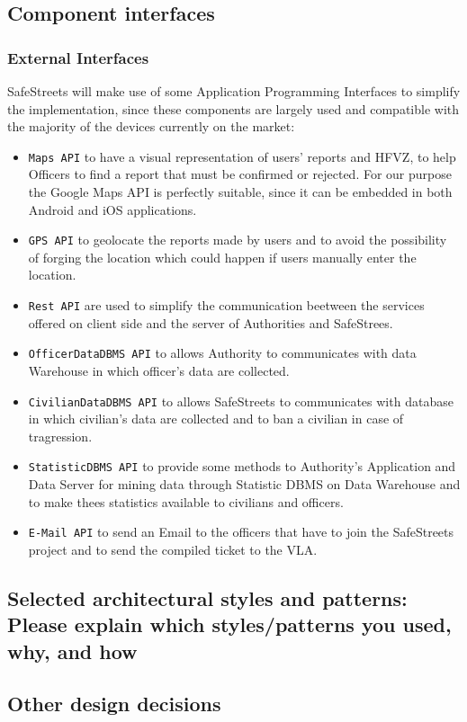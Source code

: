 \documentclass[12pt,a4paper]{article}
\begin{document}
\subsection{Component interfaces}
\subsubsection{External Interfaces}
SafeStreets will make use of some Application Programming Interfaces to simplify the implementation, since these components are largely used and compatible with the majority of the devices currently on the market:
\begin{itemize}
\item \texttt{Maps API} to have a visual representation of users' reports and HFVZ, to help Officers to find a report that must be confirmed or rejected. For our purpose the Google Maps API is perfectly suitable, since it can be embedded in both Android and iOS applications.
\item \texttt{GPS API} to geolocate the reports made by users and to avoid the possibility of forging the location which could happen if users manually enter the location.
\item \texttt{Rest API} are used to simplify the communication beetween the services offered on client side and the server of Authorities and SafeStrees.
\item \texttt{OfficerDataDBMS API} to allows Authority to communicates with data Warehouse in which officer's data are collected.
\item \texttt{CivilianDataDBMS API} to allows SafeStreets to communicates with database in which civilian's data are collected and to ban a civilian in case of tragression.
\item \texttt{StatisticDBMS API} to provide some methods to Authority's Application and Data Server for mining data through Statistic DBMS on Data Warehouse and to make thees statistics available to civilians and officers.
\item \texttt{E-Mail API} to send an Email to the officers that have to join the SafeStreets project and to send the compiled ticket to the VLA.
\end{itemize}
\subsection{Selected architectural styles and patterns: Please explain which styles/patterns you used, why, and how}
\subsection{Other design decisions}
\end{document}
